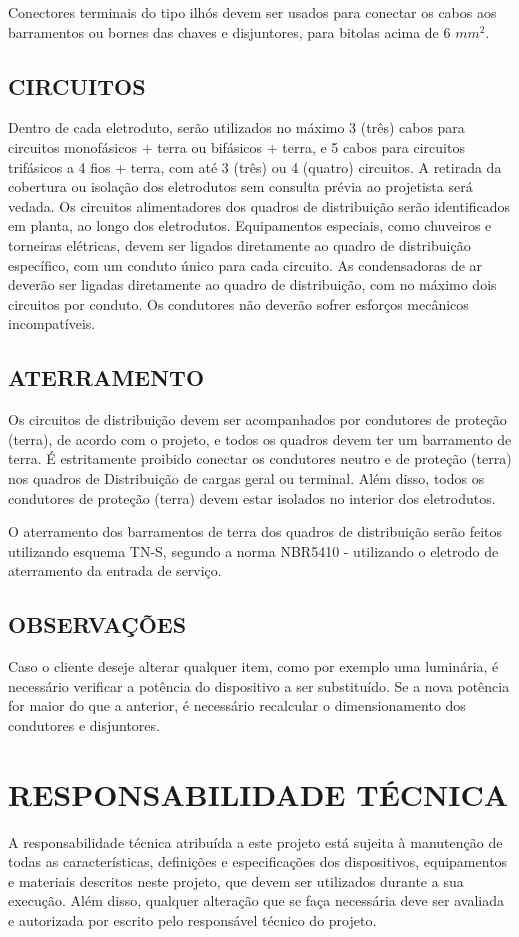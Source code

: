 Conectores terminais do tipo ilhós devem ser usados para conectar os cabos aos barramentos ou bornes das chaves e disjuntores, para bitolas acima de $6$ $mm^2$.

\subsection{CIRCUITOS}

Dentro de cada eletroduto, serão utilizados no máximo 3 (três) cabos para circuitos monofásicos + terra ou bifásicos + terra, e 5 cabos para circuitos trifásicos a 4 fios + terra, com até 3 (três) ou 4 (quatro) circuitos. A retirada da cobertura ou isolação dos eletrodutos sem consulta prévia ao projetista será vedada. Os circuitos alimentadores dos quadros de distribuição serão identificados em planta, ao longo dos eletrodutos. Equipamentos especiais, como chuveiros e torneiras elétricas, devem ser ligados diretamente ao quadro de distribuição específico, com um conduto único para cada circuito. As condensadoras de ar deverão ser ligadas diretamente ao quadro de distribuição, com no máximo dois circuitos por conduto. Os condutores não deverão sofrer esforços mecânicos incompatíveis.

\subsection{ATERRAMENTO}

Os circuitos de distribuição devem ser acompanhados por condutores de proteção (terra), de acordo com o projeto, e todos os quadros devem ter um barramento de terra. É estritamente proibido conectar os condutores neutro e de proteção (terra) nos quadros de Distribuição de cargas geral ou terminal. Além disso, todos os condutores de proteção (terra) devem estar isolados no interior dos eletrodutos.

O aterramento dos barramentos de terra dos quadros de distribuição serão feitos utilizando esquema TN-S, segundo a norma NBR5410 - utilizando o eletrodo de aterramento da entrada de serviço.

\subsection{OBSERVAÇÕES}

Caso o cliente deseje alterar qualquer item, como por exemplo uma luminária, é necessário verificar a potência do dispositivo a ser substituído. Se a nova potência for maior do que a anterior, é necessário recalcular o dimensionamento dos condutores e disjuntores.

\section{RESPONSABILIDADE TÉCNICA}

A responsabilidade técnica atribuída a este projeto está sujeita à manutenção de todas as características, definições e especificações dos dispositivos, equipamentos e materiais descritos neste projeto, que devem ser utilizados durante a sua execução. Além disso, qualquer alteração que se faça necessária deve ser avaliada e autorizada por escrito pelo responsável técnico do projeto.
